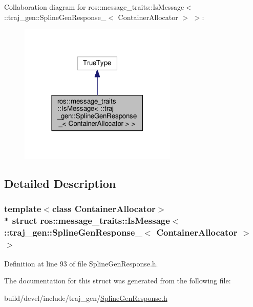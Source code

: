 Collaboration diagram for ros\+:\+:message\+\_\+traits\+:\+:Is\+Message$<$ \+:\+:traj\+\_\+gen\+:\+:Spline\+Gen\+Response\+\_\+$<$ Container\+Allocator $>$ $>$\+:
\nopagebreak
\begin{figure}[H]
\begin{center}
\leavevmode
\includegraphics[width=213pt]{structros_1_1message__traits_1_1_is_message_3_01_1_1traj__gen_1_1_spline_gen_response___3_01_cond2879e5838bdc1fa34ba9a6c21dfc31a}
\end{center}
\end{figure}


\subsection{Detailed Description}
\subsubsection*{template$<$class Container\+Allocator$>$\\*
struct ros\+::message\+\_\+traits\+::\+Is\+Message$<$ \+::traj\+\_\+gen\+::\+Spline\+Gen\+Response\+\_\+$<$ Container\+Allocator $>$ $>$}



Definition at line 93 of file Spline\+Gen\+Response.\+h.



The documentation for this struct was generated from the following file\+:\begin{DoxyCompactItemize}
\item 
build/devel/include/traj\+\_\+gen/\hyperlink{_spline_gen_response_8h}{Spline\+Gen\+Response.\+h}\end{DoxyCompactItemize}
